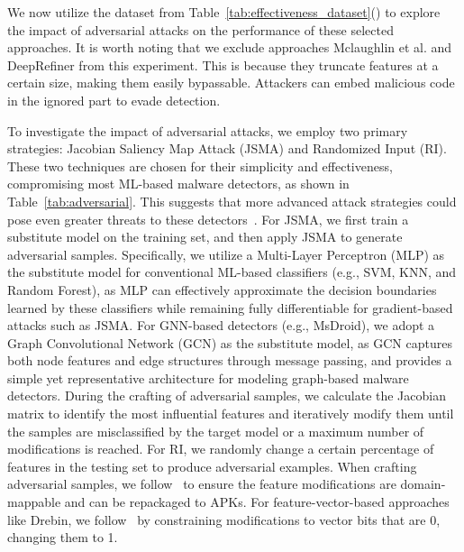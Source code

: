 We now utilize the dataset from Table~\ref{tab:effectiveness_dataset}() to explore the impact of adversarial attacks on the performance of these selected approaches.
It is worth noting that we exclude approaches Mclaughlin et al. and DeepRefiner from this experiment.
This is because they truncate features at a certain size, making them easily bypassable.
Attackers can embed malicious code in the ignored part to evade detection.



To investigate the impact of adversarial attacks, we employ two primary strategies: Jacobian Saliency Map Attack (JSMA) and Randomized Input (RI).
These two techniques are chosen for their simplicity and effectiveness, compromising most ML-based malware detectors, as shown in Table~\ref{tab:adversarial}.
This suggests that more advanced attack strategies could pose even greater threats to these detectors~\cite{he2023efficient,zhao2021structural}.
For JSMA, we first train a substitute model on the training set, and then apply JSMA to generate adversarial samples. 
Specifically, we utilize a Multi-Layer Perceptron (MLP) as the substitute model for conventional ML-based classifiers (e.g., SVM, KNN, and Random Forest), as MLP can effectively approximate the decision boundaries learned by these classifiers while remaining fully differentiable for gradient-based attacks such as JSMA.
For GNN-based detectors (e.g., MsDroid), we adopt a Graph Convolutional Network (GCN) as the substitute model, as GCN captures both node features and edge structures through message passing, and provides a simple yet representative architecture for modeling graph-based malware detectors.
During the crafting of adversarial samples, we calculate the Jacobian matrix to identify the most influential features and iteratively modify them until the samples are misclassified by the target model or a maximum number of modifications is reached.
For RI, we randomly change a certain percentage of features in the testing set to produce adversarial examples.
When crafting adversarial samples, we follow~\cite{li2023black,chen2019android} to ensure the feature modifications are domain-mappable and can be repackaged to APKs.
For feature-vector-based approaches like Drebin, we follow~\cite{chen2019android} by constraining modifications to vector bits that are 0, changing them to 1.
